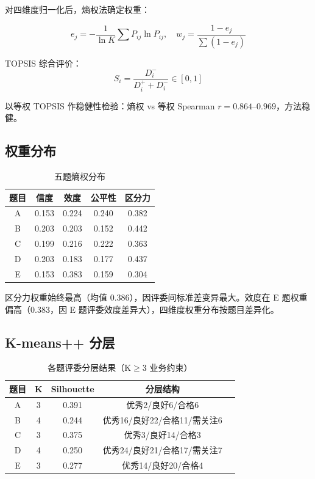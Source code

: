 \documentclass[UTF8]{ctexart}
\begin{document}
对四维度归一化后，熵权法确定权重：

\begin{equation}
e_j = -\frac{1}{\ln K}\sum P_{ij}\ln P_{ij}, \quad w_j = \frac{1-e_j}{\sum(1-e_j)}
\end{equation}

TOPSIS 综合评价：
\begin{equation}
S_i = \frac{D_i^-}{D_i^+ + D_i^-} \in [0,1]
\end{equation}

以等权 TOPSIS 作稳健性检验：熵权 vs 等权 Spearman $r = 0.864$--$0.969$，方法稳健。

\subsection{权重分布}

\begin{table}[h]
\centering
\caption{五题熵权分布}
\begin{tabular}{ccccc}
\toprule
题目 & 信度 & 效度 & 公平性 & 区分力 \\
\midrule
A & 0.153 & 0.224 & 0.240 & 0.382 \\
B & 0.203 & 0.203 & 0.152 & 0.442 \\
C & 0.199 & 0.216 & 0.222 & 0.363 \\
D & 0.203 & 0.183 & 0.177 & 0.437 \\
E & 0.153 & 0.383 & 0.159 & 0.304 \\
\bottomrule
\end{tabular}
\end{table}

区分力权重始终最高（均值 0.386），因评委间标准差变异最大。效度在 E 题权重偏高（0.383，因 E 题评委效度差异大），四维度权重分布按题目差异化。

\subsection{K-means++ 分层}

\begin{table}[h]
\centering
\caption{各题评委分层结果（K$\geq$3 业务约束）}
\begin{tabular}{ccccc}
\toprule
题目 & K & Silhouette & 分层结构 \\
\midrule
A & 3 & 0.391 & 优秀2/良好6/合格6 \\
B & 4 & 0.244 & 优秀16/良好22/合格11/需关注6 \\
C & 3 & 0.375 & 优秀3/良好14/合格3 \\
D & 4 & 0.250 & 优秀24/良好21/合格17/需关注7 \\
E & 3 & 0.277 & 优秀14/良好20/合格4 \\
\bottomrule
\end{tabular}
\end{table}
\end{document}
